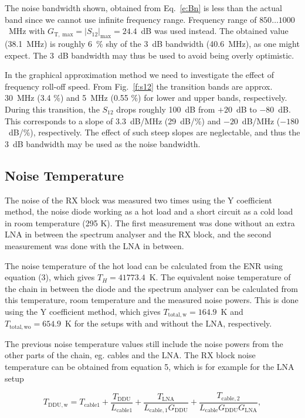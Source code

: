 \documentclass[a4paper, 12pt]{article}
\begin{document}
The noise bandwidth shown, obtained from Eq.~\ref{e:Bn} is less than the actual band since 
we cannot use infinite frequency range. Frequency range of $850 \ldots 1000$~MHz with
$G_\mathrm{T,\;max} = |S_{12}|_\mathrm{max} = 24.4$~dB was used instead. The obtained 
value (38.1~MHz) is roughly 6~\% shy of the 3~dB bandwidth (40.6~MHz), as one might expect.
The 3~dB bandwidth may thus be used to avoid being overly optimistic.

In the graphical approximation method we need to investigate the effect of frequency 
roll-off speed. From Fig.~\ref{f:s12} the transition bands are approx. 30~MHz (3.4 \%) 
and 5~MHz (0.55 \%) for lower and upper bands, respectively. During this transition, 
the $S_12$ drops roughly 100~dB from $+20$~dB to $-80$~dB. This corresponds to a slope 
of $3.3$~dB/MHz (29~dB/\%) and $-20$~dB/MHz ($-180$~dB/\%), respectively. The effect of 
such steep slopes are neglectable, and thus the 3~dB bandwidth may be used as the noise 
bandwidth.


\subsection{Noise Temperature}

\noindent
The noise of the RX block was measured two times using the Y coefficient method, the noise diode
working as a hot load and a short circuit as a cold load in room temperature (295 K). The first measurement was done without an extra LNA in between the spectrum analyser and the RX block, and the second measurement was done with the LNA in between.

The noise temperature of the hot load can be calculated from the ENR using equation (3), which gives $T_H = 41773.4$~K. The equivalent noise temperature of the chain in between the diode and the spectrum analyser can be calculated from this temperature, room temperature and the measured noise powers. This is done using the Y coefficient method, which gives $T_{\mathrm{total, w}} = 164.9$~K and $T_{\mathrm{total, wo}} = 654.9$~K for the setups with and without the LNA, respectively.

The previous noise temperature values still include the noise powers from the other parts of the chain, eg. cables and the LNA. The RX block noise temperature can be obtained from equation 5, which is for example for the LNA setup

\begin{equation}
T_\mathrm{DDU, w} = T_\mathrm{cable 1} + \frac{T_\mathrm{DDU}}{L_\mathrm{cable 1}} + \frac{T_\mathrm{LNA}}{L_\mathrm{cable, 1} G_\mathrm{DDU}} + \frac{T_\mathrm{cable, 2}}{L_\mathrm{cable} G_\mathrm{DDU} G_\mathrm{LNA}},
\end{equation}
\end{document}
